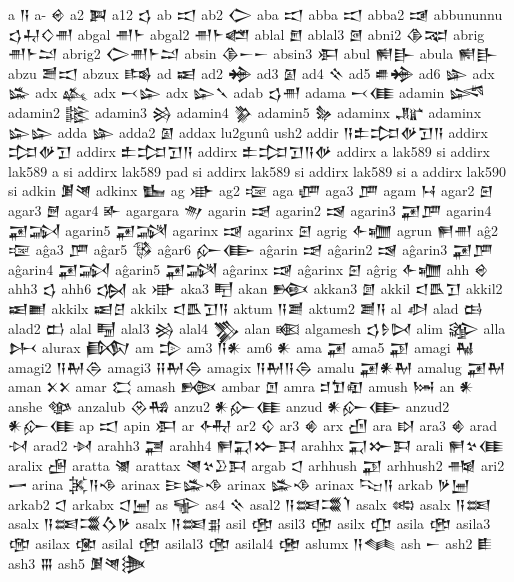  a  𒀀   
 a-  𒄴   
 a2  𒀉   
 a12  𒌓   
 ab  𒀊   
 ab2  𒀖   
 aba  𒀊   
 abba  𒀊   
 abba2  𒀋   
 abbununnu  𒌓𒄷𒄭𒉣    
 abgal  𒉣𒈨    
 abgal2  𒉣𒈨𒅤    
 ablal  𒆼   
 ablal3  𒇦   
 abni2  𒆠𒉈    
 abrig  𒉣𒈨𒁺    
 abrig2  𒀖𒉣𒈨𒁺    
 absin  𒆠𒀸𒀸    
 absin3  𒀳   
 abul  𒆍𒃲    
 abula  𒆍𒃲    
 abzu  𒍪𒀊    
 abzux  𒌤   
 ad  𒀜   
 ad2  𒄉   
 ad3  𒇼   
 ad4  𒍞   
 ad5  𒌑𒄉    
 ad6  𒇿   
 adx  𒈕   
 adx  𒎉   
 adx  𒁁𒇽    
 adx  𒇽𒃵      
 adab  𒌓𒉣    
 adama  𒁁𒈪    
 adamin  𒈓   
 adamin2  𒈘   
 adamin3  𒄒   
 adamin4  𒉫   
 adamin5  𒂛   
 adaminx  𒂜   
 adaminx  𒇽𒇽    
 adda  𒇿   
 adda2  𒇼   
 addax  lu2gunû ush2  
 addir  𒀀𒉺𒄐𒉻𒋛𒀀    
 addirx  𒄐𒉻𒋛    
 addirx  𒉺𒄐𒋛𒀀    
 addirx  𒉺𒄐𒋛𒀀𒉻    
 addirx  a lak589 si   
 addirx  lak589 a si   
 addirx  lak589 pad si   
 addirx  lak589 si   
 addirx  lak589 si a   
 addirx  lak590 si   
 adkin  𒋠𒇴    
 adkinx  𒋁   
 ag  𒀝   
 ag2  𒉘   
 aga  𒂇   
 aga3  𒂆   
 agam  𒀂   
 agar2  𒇋   
 agar3  𒆻   
 agar4  𒅊   
 agargara  𒉩   
 agarin  𒀌   
 agarin2  𒀎   
 agarin3  𒂼𒂆    
 agarin4  𒂼𒋆    
 agarin5  𒂼𒋋    
 agarinx  𒀏   
 agarinx  𒇉   
 agrig  𒅆𒁾    
 agrun  𒂍𒉣    
 aĝ2  𒉘   
 aĝa3  𒂆   
 aĝar5  𒅐   
 aĝar6  𒅎𒂂    
 aĝarin  𒀌   
 aĝarin2  𒀎   
 aĝarin3  𒂼𒂆    
 aĝarin4  𒂼𒋆    
 aĝarin5  𒂼𒋋    
 aĝarinx  𒀏   
 aĝarinx  𒇉   
 aĝrig  𒅆𒁾    
 ahh  𒄴   
 ahh3  𒌓   
 ahh6  𒌔   
 ak  𒀝   
 aka3  𒋃   
 akan  𒁛   
 akkan3  𒇖   
 akkil  𒃰𒋺𒋛    
 akkil2  𒀜𒆤    
 akkilx  𒀜𒆪    
 akkilx  𒃰𒋺𒋛𒀀    
 aktum  𒀀𒋢    
 aktum2  𒋢𒀀    
 al  𒀠   
 alad  𒆘   
 alad2  𒆗   
 alal  𒋄   
 alal3  𒄒   
 alal4  𒃺   
 alan  𒀩   
 algamesh  𒌓𒊩𒄸    
 alim  𒄋   
 alla  𒉄   
 alurax  𒁃   
 am  𒄠   
 am3  𒀀𒀭    
 am6  𒀭   
 ama  𒂼   
 ama5  𒃣   
 amagi  𒈻   
 amagi2  𒀀𒈹𒁲    
 amagi3  𒍝𒈹𒁲    
 amagix  𒀀𒈹𒀀𒁲    
 amalu  𒂼𒀭𒈹    
 amalug  𒂼𒈹    
 aman  𒉽𒉽    
 amar  𒀫   
 amash  𒁦   
 ambar  𒆹   
 amra  𒄑𒈣𒊏    
 amush  𒀇   
 an  𒀭   
 anshe  𒀲   
 anzalub  𒊮𒄀    
 anzu2  𒀭𒅎𒈪    
 anzud  𒀭𒅎𒂂    
 anzud2  𒀭𒅎𒈪    
 ap  𒀊   
 apin  𒀳   
 ar  𒅈   
 ar2  𒄱   
 ar3  𒄯   
 arx  𒌸   
 ara  𒊭   
 ara3  𒄯   
 arad  𒀴   
 arad2  𒀵   
 arahh3  𒃥   
 arahh4  𒂍𒍑𒁍𒁕    
 arahhx  𒍑𒁍𒁕    
 arali  𒂍𒆳𒈪    
 aralix  𒌽   
 aratta  𒇶   
 arattax  𒇴𒆳𒊒𒁕    
 argab  𒀶   
 arhhush  𒃣   
 arhhush2  𒉦   
 ari2  𒅂   
 arina  𒈸𒀀𒈾    
 arinax  𒄿𒈕𒈾    
 arinax  𒈕𒈾    
 arinax  𒌫𒀀    
 arkab  𒃻𒅁    
 arkab2  𒀶   
 arkabx  𒀶𒅁    
 as  𒊍   
 as4  𒍞   
 asal2  𒀀𒌅𒃮𒇺    
 asalx  𒀷   
 asalx  𒀀𒌅    
 asalx  𒀀𒌅𒃮𒋝𒃻    
 asalx  𒀀𒌅𒉪    
 asil  𒂰   
 asil3  𒂢   
 asilx  𒂡   
 asila  𒂰   
 asila3  𒂢   
 asilax  𒂬   
 asilal  𒂰   
 asilal3  𒂢   
 asilal4  𒂤   
 aslumx  𒀀𒈝    
 ash  𒀸   
 ash2  𒀾   
 ash3  𒐋   
 ash5  𒋠𒇴𒋦    

